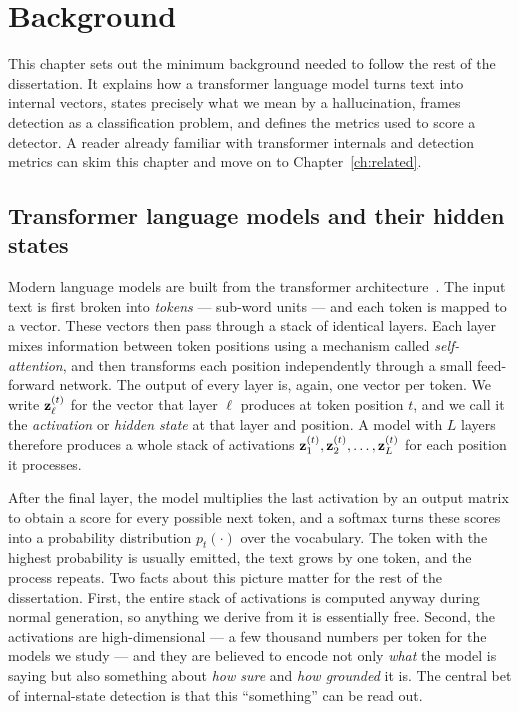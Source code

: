 \chapter{Background}
\label{ch:background}

This chapter sets out the minimum background needed to follow the rest of the
dissertation. It explains how a transformer language model turns text into internal
vectors, states precisely what we mean by a hallucination, frames detection as a
classification problem, and defines the metrics used to score a detector. A reader
already familiar with transformer internals and detection metrics can skim this chapter
and move on to Chapter~\ref{ch:related}.

\section{Transformer language models and their hidden states}

Modern language models are built from the transformer architecture~\cite{vaswani2017attention}.
The input text is first broken into \emph{tokens} --- sub-word units --- and each token
is mapped to a vector. These vectors then pass through a stack of identical layers. Each
layer mixes information between token positions using a mechanism called
\emph{self-attention}, and then transforms each position independently through a small
feed-forward network. The output of every layer is, again, one vector per token. We
write $\mathbf{z}_\ell^{(t)}$ for the vector that layer $\ell$ produces at token position
$t$, and we call it the \emph{activation} or \emph{hidden state} at that layer and
position. A model with $L$ layers therefore produces a whole stack of activations
$\mathbf{z}_1^{(t)}, \mathbf{z}_2^{(t)}, \dots, \mathbf{z}_L^{(t)}$ for each position it processes.

After the final layer, the model multiplies the last activation by an output matrix to
obtain a score for every possible next token, and a softmax turns these scores into a
probability distribution $p_t(\cdot)$ over the vocabulary. The token with the highest
probability is usually emitted, the text grows by one token, and the process repeats.
Two facts about this picture matter for the rest of the dissertation. First, the entire
stack of activations is computed anyway during normal generation, so anything we derive
from it is essentially free. Second, the activations are high-dimensional --- a few
thousand numbers per token for the models we study --- and they are believed to encode
not only \emph{what} the model is saying but also something about \emph{how sure} and
\emph{how grounded} it is. The central bet of internal-state detection is that this
``something'' can be read out.

